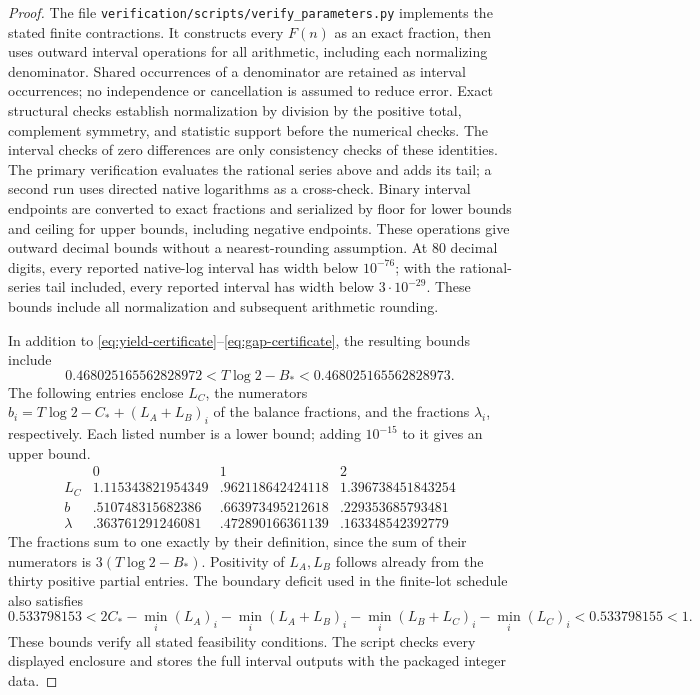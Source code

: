 \begin{proof}
The file \texttt{verification/scripts/verify\_parameters.py} implements the
stated finite contractions. It constructs every $F(n)$ as an exact fraction,
then uses outward interval operations for all arithmetic, including each
normalizing denominator. Shared occurrences of a denominator are retained
as interval occurrences; no independence or cancellation is assumed to
reduce error. Exact structural checks establish normalization by division
by the positive total, complement symmetry, and statistic support before
the numerical checks. The interval checks of zero differences are only
consistency checks of these identities.
The primary verification evaluates the rational series above and adds its
tail; a second run uses directed native logarithms as a cross-check.
Binary interval endpoints are converted to exact fractions and serialized
by floor for lower bounds and ceiling for upper bounds, including negative
endpoints. These operations give outward decimal bounds without a
nearest-rounding assumption. At 80 decimal digits, every reported native-log
interval has width below $10^{-76}$; with the rational-series tail included,
every reported interval has width below $3\cdot10^{-29}$. These bounds include
all normalization and subsequent arithmetic rounding.

In addition to \eqref{eq:yield-certificate}--\eqref{eq:gap-certificate},
the resulting bounds include
\[
 0.468025165562828972<T\log2-B_*<0.468025165562828973.
\]
The following entries enclose $L_C$, the numerators
$b_i=T\log2-C_*+(L_A+L_B)_i$ of the balance fractions, and the fractions
$\lambda_i$, respectively. Each listed number is a lower bound; adding
$10^{-15}$ to it gives an upper bound.
\[
\begin{array}{c|rrr}
 &0&1&2\\\hline
 L_C&1.115343821954349&.962118642424118&1.396738451843254\\
 b&.510748315682386&.663973495212618&.229353685793481\\
 \lambda&.363761291246081&.472890166361139&.163348542392779
\end{array}
\]
The fractions sum to one exactly by their definition, since the sum of
their numerators is $3(T\log2-B_*)$. Positivity of $L_A,L_B$ follows
already from the thirty positive partial entries. The boundary deficit
used in the finite-lot schedule also satisfies
\[
 0.533798153<2C_*-\min_i(L_A)_i-\min_i(L_A+L_B)_i
 -\min_i(L_B+L_C)_i-\min_i(L_C)_i<0.533798155<1.
\]
These bounds verify all stated feasibility conditions. The script checks
every displayed enclosure and stores the full interval outputs
with the packaged integer data.


\end{proof}
